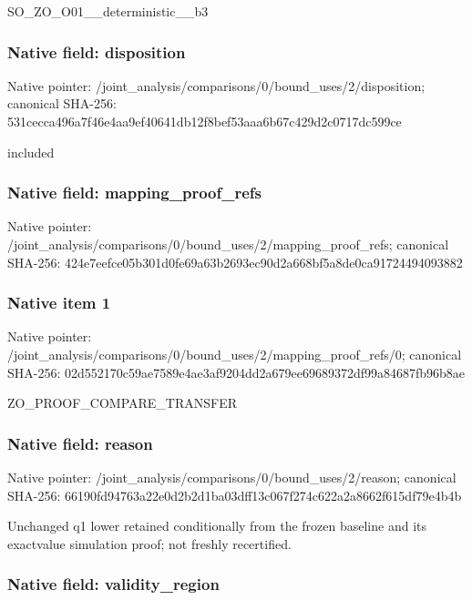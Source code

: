 \documentclass[10pt,a4paper]{article}
\begin{document}
SO\_ZO\_O01\_\_deterministic\_\_b3


\subsubsection{Native field: disposition}


Native pointer: /joint\_analysis/comparis\allowbreak{}ons/0/bound\_uses/2/dispo\allowbreak{}sition; canonical SHA-256: 531cecca496a7f46e4aa9ef4\allowbreak{}0641db12f8bef53aaa6b67c4\allowbreak{}29d2c0717dc599ce


included


\subsubsection{Native field: mapping\_proof\_refs}


Native pointer: /joint\_analysis/comparis\allowbreak{}ons/0/bound\_uses/2/mappi\allowbreak{}ng\_proof\_refs; canonical SHA-256: 424e7eefce05b301d0fe69a6\allowbreak{}3b2693ec90d2a668bf5a8de0\allowbreak{}ca91724494093882



\subsubsection{Native item 1}


Native pointer: /joint\_analysis/comparis\allowbreak{}ons/0/bound\_uses/2/mappi\allowbreak{}ng\_proof\_refs/0; canonical SHA-256: 02d552170c59ae7589e4ae3a\allowbreak{}f9204dd2a679ee69689372df\allowbreak{}99a84687fb96b8ae


ZO\_PROOF\_COMPARE\_TRANSFER


\subsubsection{Native field: reason}


Native pointer: /joint\_analysis/comparis\allowbreak{}ons/0/bound\_uses/2/reaso\allowbreak{}n; canonical SHA-256: 66190fd94763a22e0d2b2d1b\allowbreak{}a03dff13c067f274c622a2a8\allowbreak{}662f615df79e4b4b


Unchanged q1 lower retained conditionally from the frozen baseline and its exactvalue simulation proof; not freshly recertified.


\subsubsection{Native field: validity\_region}
\end{document}
